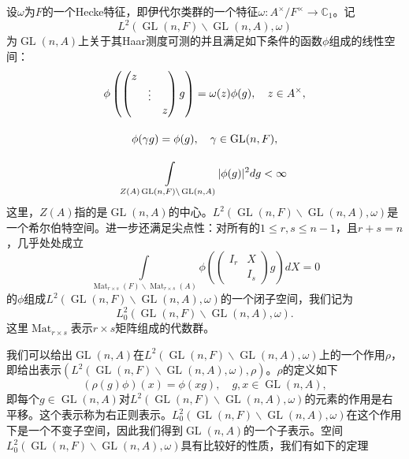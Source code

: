 设$\omega$为$F$的一个Hecke特征，即伊代尔类群的一个特征$\omega: A^\times / F^\times \rightarrow \mathbb{C}_1$。记
$$L^2\left( \operatorname{GL}(n,F)\backslash \operatorname{GL}(n,A), \omega \right)$$
为$\operatorname{GL}(n, A)$上关于其Haar测度\cite{ramakrishnan2005fourier}可测的并且满足如下条件的函数$\phi$组成的线性空间：
\begin{gather}
\phi \left( \begin{pmatrix} z & & \\ & \vdots & \\ & & z \end{pmatrix} g \right) = \omega(z)\phi(g), \quad z\in A^\times, \\[1em]
\phi(\gamma g) = \phi(g), \quad \gamma \in \operatorname{GL}(n,F), \\[1em]
\int\limits_{Z(A)\operatorname{GL}(n,F)\backslash \operatorname{GL}(n,A)} \lvert \phi(g) \rvert^2 dg < \infty \notag
\end{gather}
这里，$Z(A)$指的是$\operatorname{GL}(n, A)$的中心。$L^2\left( \operatorname{GL}(n,F)\backslash \operatorname{GL}(n,A), \omega \right)$是一个希尔伯特空间。进一步还满足尖点性：对所有的$1 \leqslant r,s \leqslant n-1$，且$r+s=n$，几乎处处成立
\begin{equation}
\int\limits_{\operatorname{Mat}_{r\times s}(F) \backslash \operatorname{Mat}_{r\times s}(A)} \phi \left( \begin{pmatrix} I_r & X \\ & I_s \end{pmatrix} g \right) dX = 0
\end{equation}
的$\phi$组成$L^2\left( \operatorname{GL}(n,F)\backslash \operatorname{GL}(n,A), \omega \right)$的一个闭子空间，我们记为
$$L^2_0\left( \operatorname{GL}(n,F)\backslash \operatorname{GL}(n,A), \omega \right).$$
这里$\operatorname{Mat}_{r\times s}$表示$r\times s$矩阵组成的代数群。

我们可以给出$\operatorname{GL}(n,A)$在$L^2\left( \operatorname{GL}(n,F)\backslash \operatorname{GL}(n,A), \omega \right)$上的一个作用$\rho$，即给出表示$\left( L^2\left( \operatorname{GL}(n,F)\backslash \operatorname{GL}(n,A), \omega \right), \rho \right)$。$\rho$的定义如下
$$
(\rho(g)\phi)(x) = \phi(xg), \quad g,x \in \operatorname{GL}(n,A),
$$
即每个$g\in \operatorname{GL}(n,A)$对$L^2\left( \operatorname{GL}(n,F)\backslash \operatorname{GL}(n,A), \omega \right)$的元素的作用是右平移。这个表示称为右正则表示。$L^2_0\left( \operatorname{GL}(n,F)\backslash \operatorname{GL}(n,A), \omega \right)$在这个作用下是一个不变子空间，因此我们得到$\operatorname{GL}(n,A)$的一个子表示。空间$L^2_0\left( \operatorname{GL}(n,F)\backslash \operatorname{GL}(n,A), \omega \right)$具有比较好的性质，我们有如下的定理

